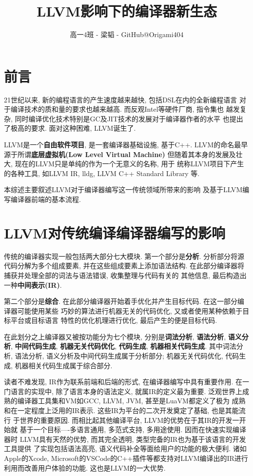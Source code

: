 \documentclass[UTF8]{ctexart}
\title{LLVM影响下的编译器新生态}
\author{高一4班 - 梁韬 - GitHub@Origami404}
\begin{document}
\maketitle
\section{前言}
21世纪以来, 新的编程语言的产生速度越来越快, 包括DSL在内的全新编程语言
对于编译技术的质和量的要求也越来越高. 而反观Intel等硬件厂商, 指令集也
越发复杂, 同时编译优化技术特别是GC及JIT技术的发展对于编译器作者的水平
也提出了极高的要求. 面对这种困难, LLVM诞生了.


LLVM是一个\textbf{自由软件项目}, 是一套编译器基础设施, 基于C++.
LLVM的命名最早源于所谓\textbf{底层虚拟机(Low Level Virtual Machine)}
但随着其本身的发展及壮大, 现在的LLVM只是单纯的作为一个无意义的名称, 用于
统称LLVM项目下产生的各种工具, 如LLVM IR, lldg, LLVM C++ Standard Library
等.


本综述主要叙述LLVM对于编译器编写这一传统领域所带来的影响
及基于LLVM编写编译器前端的基本流程.

\section{LLVM对传统编译编译器编写的影响}
传统的编译器实现一般包括两大部分七大模块. 
第一个部分是\textbf{分析}.
分析部分将源代码分解为多个组成要素, 并在这些组成要素上添加语法结构.
在此部分编译器将捕获并处理全部的词法与语法错误, 收集整理与代码有关的
其他信息, 最后构造出一种\textbf{中间表示(IR)}.


第二个部分是\textbf{综合}.
在此部分编译器开始着手优化并产生目标代码. 在这一部分编译器可能使用某些
巧妙的算法进行机器无关的代码优化, 又或者使用某种依赖于目标平台或目标语言
特性的优化机理进行优化, 最后产生的便是目标代码.


在此划分之上编译器又被按功能分为七个模块, 分别是\textbf{词法分析}, 
\textbf{语法分析}, \textbf{语义分析}, \textbf{中间代码生成}, 
\textbf{机器无关代码优化}, \textbf{代码生成}, \textbf{机器相关代码生成}.
其中词法分析, 语法分析, 语义分析及中间代码生成属于分析部分; 机器无关代码优化, 
代码生成, 机器相关代码生成属于综合部分.


读者不难发现, IR作为联系前端和后端的形式, 在编译器编写中具有重要作用.
在一门语言的实现中, 除了语言本身的语法定义, 就属IR的定义最为重要. 
泛观世界上成熟的编译器工具集和VM如GCC, LLVM, JVM, 甚至是LuaVM都定义了极为
成熟和在一定程度上泛用的IR表示. 这些IR为平台的二次开发奠定了基础, 也是其能流行
于世界的重要原因. 而相比起其他编译平台, LLVM的优势在于其IR的开发一开始就
基于一个目标----多语言通用, 多范式支持, 多用途使用. 因而在快速实现编译器时
LLVM具有天然的优势, 而其完全透明, 类型完备的IR也为基于该语言的开发工具提供
了实现包括语法高亮, 语义代码补全等面给用户的功能的极大便利. 诸如Apple的Xcode,
Microsoft的VSCode的C++插件等都支持对LLVM编译出的IR进行利用而改善用户体验的功能.
这也是LLVM的一大优势.
\end{document}
